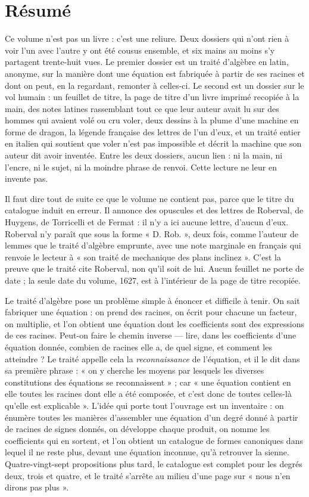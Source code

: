 \documentclass[11pt,a4paper]{article}
\begin{document}
\section*{Résumé}

\begin{resume}
Ce volume n'est pas un livre : c'est une reliure. Deux dossiers qui n'ont rien à
voir l'un avec l'autre y ont été cousus ensemble, et six mains au moins s'y
partagent trente-huit vues. Le premier dossier est un traité d'algèbre en latin,
anonyme, sur la manière dont une équation est fabriquée à partir de ses racines
et dont on peut, en la regardant, remonter à celles-ci. Le second est un dossier
sur le vol humain : un feuillet de titre, la page de titre d'un livre imprimé
recopiée à la main, des notes latines rassemblant tout ce que leur auteur avait
lu sur des hommes qui avaient volé ou cru voler, deux dessins à la plume d'une
machine en forme de dragon, la légende française des lettres de l'un d'eux, et
un traité entier en italien qui soutient que voler n'est pas impossible et
décrit la machine que son auteur dit avoir inventée. Entre les deux dossiers,
aucun lien : ni la main, ni l'encre, ni le sujet, ni la moindre phrase de
renvoi. Cette lecture ne leur en invente pas.

Il faut dire tout de suite ce que le volume ne contient pas, parce que le titre
du catalogue induit en erreur. Il annonce des opuscules et des lettres de
Roberval, de Huygens, de Torricelli et de Fermat : il n'y a ici aucune lettre,
d'aucun d'eux. Roberval n'y paraît que sous la forme « D. Rob. », deux fois,
comme l'auteur de lemmes que le traité d'algèbre emprunte, avec une note
marginale en français qui renvoie le lecteur à « son traité de mechanique des
plans inclinez ». C'est la preuve que le traité cite Roberval, non qu'il soit de
lui. Aucun feuillet ne porte de date ; la seule date du volume, 1627, est à
l'intérieur de la page de titre recopiée.

Le traité d'algèbre pose un problème simple à énoncer et difficile à tenir. On
sait fabriquer une équation : on prend des racines, on écrit pour chacune un
facteur, on multiplie, et l'on obtient une équation dont les coefficients sont
des expressions de ces racines. Peut-on faire le chemin inverse — lire, dans les
coefficients d'une équation donnée, combien de racines elle a, de quel signe, et
comment les atteindre ? Le traité appelle cela la \emph{reconnaissance} de
l'équation, et il le dit dans sa première phrase : « on y cherche les moyens par
lesquels les diverses constitutions des équations se reconnaissent » ; car « une
équation contient en elle toutes les racines dont elle a été composée, et c'est
donc de toutes celles-là qu'elle est explicable ». L'idée qui porte tout
l'ouvrage est un inventaire : on énumère toutes les manières d'assembler une
équation d'un degré donné à partir de racines de signes donnés, on développe
chaque produit, on nomme les coefficients qui en sortent, et l'on obtient un
catalogue de formes canoniques dans lequel il ne reste plus, devant une équation
inconnue, qu'à retrouver la sienne. Quatre-vingt-sept propositions plus tard, le
catalogue est complet pour les degrés deux, trois et quatre, et le traité
s'arrête au milieu d'une page sur « nous n'en dirons pas plus ».


\end{resume}
\end{document}
